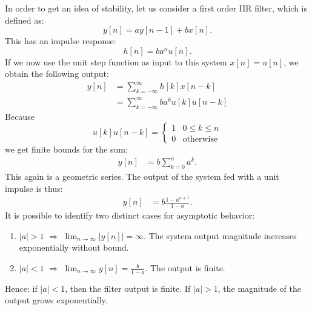     In order to get an idea of stability, let us consider a first order IIR filter, which is defined as:
    \begin{equation}
        y[n] = a y[n-1] + b x[n].
    \end{equation}
    This has an impulse response:
    \begin{equation}
        h[n] = b a^n u[n].
    \end{equation}
    If we now use the unit step function as input to this system $x[n]=u[n]$, we obtain the following output:
    \begin{align}
        y[n] & = \sum_{k=-\infty}^{\infty} h[k]x[n-k]       \\
             & = \sum_{k=-\infty}^{\infty} b a^k u[k]u[n-k]
    \end{align}
    Because
    \begin{equation}
        u[k]u[n-k] = \left\{\begin{array}{cc}
            1 & 0 \le k \le n      \\
            0 & \mathrm{otherwise}
        \end{array}
        \right.
    \end{equation}
    we get finite bounds for the sum:
    \begin{align}
        y[n] & = b \sum_{k=0}^{n} a^k.
    \end{align}
    This again is a geometric series. The output of the system fed with a unit impulse is thus:
    \begin{align}
        y[n] & = b\frac{1-a^{n+1}}{1-a}.
    \end{align}
    It is possible to identify two distinct cases for asymptotic behavior:
    \begin{enumerate}
        \item $|a|>1$ $\Rightarrow$ $\lim_{n\rightarrow \infty} |y[n]| = \infty$. The system output magnitude increases exponentially without bound.
        \item $|a|<1$ $\Rightarrow$ $\lim_{n\rightarrow \infty}y[n]=\frac{b}{1-a}$. The output is finite.
    \end{enumerate}
    Hence: if $|a|<1$, then the filter output is finite. If $|a|>1$, the magnitude of the output grows exponentially.
